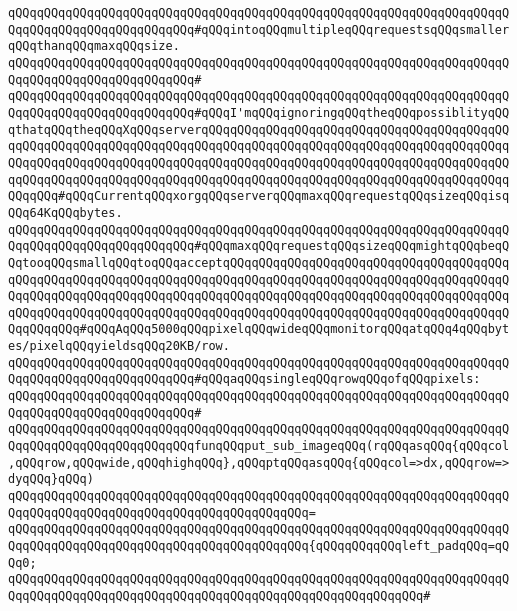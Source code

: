\verb|qQQqqQQqqQQqqQQqqQQqqQQqqQQqqQQqqQQqqQQqqQQqqQQqqQQqqQQqqQQqqQQqqQQqqQQqqQQqqQQqqQQqqQQqqQQqqQQq#qQQqintoqQQqmultipleqQQqrequestsqQQqsmallerqQQqthanqQQqmaxqQQqsize.|\newline
\verb|qQQqqQQqqQQqqQQqqQQqqQQqqQQqqQQqqQQqqQQqqQQqqQQqqQQqqQQqqQQqqQQqqQQqqQQqqQQqqQQqqQQqqQQqqQQqqQQq#|\newline
\verb|qQQqqQQqqQQqqQQqqQQqqQQqqQQqqQQqqQQqqQQqqQQqqQQqqQQqqQQqqQQqqQQqqQQqqQQqqQQqqQQqqQQqqQQqqQQqqQQq#qQQqI'mqQQqignoringqQQqtheqQQqpossiblityqQQqthatqQQqtheqQQqXqQQqserverqQQqqQQqqQQqqQQqqQQqqQQqqQQqqQQqqQQqqQQqqQQqqQQqqQQqqQQqqQQqqQQqqQQqqQQqqQQqqQQqqQQqqQQqqQQqqQQqqQQqqQQqqQQqqQQqqQQqqQQqqQQqqQQqqQQqqQQqqQQqqQQqqQQqqQQqqQQqqQQqqQQqqQQqqQQqqQQqqQQqqQQqqQQqqQQqqQQqqQQqqQQqqQQqqQQqqQQqqQQqqQQqqQQqqQQqqQQqqQQqqQQqqQQqqQQqqQQqqQQq#qQQqCurrentqQQqxorgqQQqserverqQQqmaxqQQqrequestqQQqsizeqQQqisqQQq64KqQQqbytes.|\newline
\verb|qQQqqQQqqQQqqQQqqQQqqQQqqQQqqQQqqQQqqQQqqQQqqQQqqQQqqQQqqQQqqQQqqQQqqQQqqQQqqQQqqQQqqQQqqQQqqQQq#qQQqmaxqQQqrequestqQQqsizeqQQqmightqQQqbeqQQqtooqQQqsmallqQQqtoqQQqacceptqQQqqQQqqQQqqQQqqQQqqQQqqQQqqQQqqQQqqQQqqQQqqQQqqQQqqQQqqQQqqQQqqQQqqQQqqQQqqQQqqQQqqQQqqQQqqQQqqQQqqQQqqQQqqQQqqQQqqQQqqQQqqQQqqQQqqQQqqQQqqQQqqQQqqQQqqQQqqQQqqQQqqQQqqQQqqQQqqQQqqQQqqQQqqQQqqQQqqQQqqQQqqQQqqQQqqQQqqQQqqQQqqQQqqQQqqQQqqQQqqQQqqQQqqQQqqQQqqQQq#qQQqAqQQq5000qQQqpixelqQQqwideqQQqmonitorqQQqatqQQq4qQQqbytes/pixelqQQqyieldsqQQq20KB/row.|\newline
\verb|qQQqqQQqqQQqqQQqqQQqqQQqqQQqqQQqqQQqqQQqqQQqqQQqqQQqqQQqqQQqqQQqqQQqqQQqqQQqqQQqqQQqqQQqqQQqqQQq#qQQqaqQQqsingleqQQqrowqQQqofqQQqpixels:|\newline
\verb|qQQqqQQqqQQqqQQqqQQqqQQqqQQqqQQqqQQqqQQqqQQqqQQqqQQqqQQqqQQqqQQqqQQqqQQqqQQqqQQqqQQqqQQqqQQqqQQq#|\newline
\verb|qQQqqQQqqQQqqQQqqQQqqQQqqQQqqQQqqQQqqQQqqQQqqQQqqQQqqQQqqQQqqQQqqQQqqQQqqQQqqQQqqQQqqQQqqQQqqQQqfunqQQqput_sub_imageqQQq(rqQQqasqQQq{qQQqcol,qQQqrow,qQQqwide,qQQqhighqQQq},qQQqptqQQqasqQQq{qQQqcol=>dx,qQQqrow=>dyqQQq}qQQq)|\newline
\verb|qQQqqQQqqQQqqQQqqQQqqQQqqQQqqQQqqQQqqQQqqQQqqQQqqQQqqQQqqQQqqQQqqQQqqQQqqQQqqQQqqQQqqQQqqQQqqQQqqQQqqQQqqQQqqQQq=|\newline
\verb|qQQqqQQqqQQqqQQqqQQqqQQqqQQqqQQqqQQqqQQqqQQqqQQqqQQqqQQqqQQqqQQqqQQqqQQqqQQqqQQqqQQqqQQqqQQqqQQqqQQqqQQqqQQqqQQq{qQQqqQQqqQQqleft_padqQQq=qQQq0;|\newline
\verb|qQQqqQQqqQQqqQQqqQQqqQQqqQQqqQQqqQQqqQQqqQQqqQQqqQQqqQQqqQQqqQQqqQQqqQQqqQQqqQQqqQQqqQQqqQQqqQQqqQQqqQQqqQQqqQQqqQQqqQQqqQQqqQQq#|\newline
